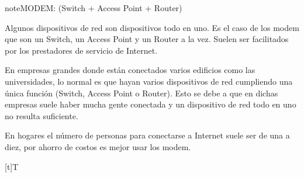 \documentclass[letterpaper,10pt,spanish]{sphinxmanual}
\let\sphinxpxdimen\pdfpxdimen\else\newdimen\sphinxpxdimen
\begin{document}
\begin{sphinxadmonition}{note}{MODEM: (Switch + Access Point + Router)}

\sphinxAtStartPar
Algunos dispositivos de red son dispositivos todo en uno. Es el caso de los modem que son un Switch, un Access Point y un Router a la vez. Suelen ser facilitados por los prestadores de servicio de Internet.

\sphinxAtStartPar
En empresas grandes donde están conectados varios edificios como las universidades, lo normal es que hayan varios dispositivos de red cumpliendo una única función (Switch, Access Point o Router). Esto se debe a que en dichas empresas suele haber mucha gente conectada y un dispositivo de red todo en uno no resulta suficiente.

\sphinxAtStartPar
En hogares el número de personas para conectarse a Internet suele ser de una a diez, por ahorro de costos es mejor usar los modem.


\begin{savenotes}\sphinxattablestart
\sphinxthistablewithglobalstyle
\centering
\begin{tabulary}{\linewidth}[t]{T}
\sphinxtoprule
\sphinxtableatstartofbodyhook

\begin{sphinxfigure-in-table}
\centering
\capstart
\noindent\sphinxincludegraphics[width=300\sphinxpxdimen]{{image091}.png}
\label{\detokenize{1_guias/10informatica/G1003:id9}}\end{sphinxfigure-in-table}\relax
\\
\sphinxbottomrule
\end{tabulary}
\sphinxtableafterendhook\par
\sphinxattableend\end{savenotes}
\end{sphinxadmonition}
\end{document}

